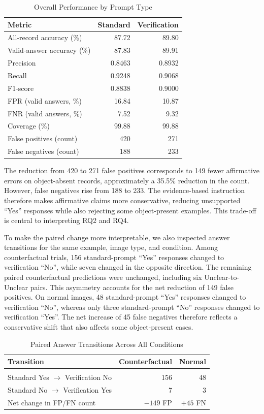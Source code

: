 \documentclass[conference]{IEEEtran}
\begin{document}
\begin{table}[t]
\caption{Overall Performance by Prompt Type}
\label{tab:overall}
\centering
\footnotesize
\begin{tabular}{lrr}
\toprule
Metric & Standard & Verification \\
\midrule
All-record accuracy (\%) & 87.72 & 89.80 \\
Valid-answer accuracy (\%) & 87.83 & 89.91 \\
Precision & 0.8463 & 0.8932 \\
Recall & 0.9248 & 0.9068 \\
F1-score & 0.8838 & 0.9000 \\
FPR (valid answers, \%) & 16.84 & 10.87 \\
FNR (valid answers, \%) & 7.52 & 9.32 \\
Coverage (\%) & 99.88 & 99.88 \\
False positives (count) & 420 & 271 \\
False negatives (count) & 188 & 233 \\
\bottomrule
\end{tabular}
\end{table}

The reduction from 420 to 271 false positives corresponds to 149 fewer affirmative errors on object-absent records, approximately a 35.5\% reduction in the count. However, false negatives rise from 188 to 233. The evidence-based instruction therefore makes affirmative claims more conservative, reducing unsupported ``Yes'' responses while also rejecting some object-present examples. This trade-off is central to interpreting RQ2 and RQ4.

To make the paired change more interpretable, we also inspected answer transitions for the same example, image type, and condition. Among counterfactual trials, 156 standard-prompt ``Yes'' responses changed to verification ``No'', while seven changed in the opposite direction. The remaining paired counterfactual predictions were unchanged, including six Unclear-to-Unclear pairs. This asymmetry accounts for the net reduction of 149 false positives. On normal images, 48 standard-prompt ``Yes'' responses changed to verification ``No'', whereas only three standard-prompt ``No'' responses changed to verification ``Yes''. The net increase of 45 false negatives therefore reflects a conservative shift that also affects some object-present cases.

\begin{table}[t]
\caption{Paired Answer Transitions Across All Conditions}
\label{tab:transitions}
\centering
\footnotesize
\begin{tabular}{lrr}
\toprule
Transition & Counterfactual & Normal \\
\midrule \\
Standard Yes $\rightarrow$ Verification No & 156 & 48 \\
Standard No $\rightarrow$ Verification Yes & 7 & 3 \\
Net change in FP/FN count & $-149$ FP & $+45$ FN \\
\bottomrule
\end{tabular}
\end{table}
\end{document}
